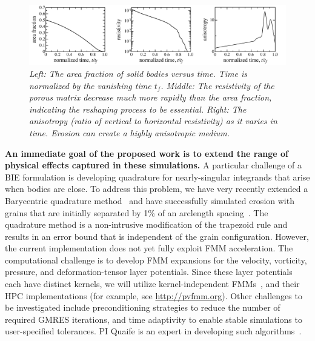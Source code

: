 \documentclass[11pt]{article}
\begin{document}
\begin{figure}%
\begin{center}
\includegraphics[width = 0.99 \textwidth]{./figs/fig3.pdf}
  \caption{\label{fig3} \em Left: The area fraction of solid bodies versus time. Time is normalized by the vanishing time $t_f$.  Middle: The resistivity of the porous matrix decrease much more rapidly than the area fraction, indicating the reshaping process to be essential. Right: The anisotropy (ratio of vertical to horizontal resistivity) as it varies in time. Erosion can create a highly anisotropic medium.} 
\end{center}
\end{figure}

{\bf An immediate goal of the proposed work is to extend the range of
physical effects captured in these simulations.} A particular challenge
of a BIE formulation is developing quadrature for nearly-singular
integrands that arise when bodies are close. To address this problem, we
have very recently extended a Barycentric quadrature
method~\cite{bar2014, bar-wu-vee2015} and have successfully simulated
erosion with grains that are initially separated by 1\% of an arclength
spacing~\cite{chi-moo-qua2019}. The quadrature method is a non-intrusive
modification of the trapezoid rule and results in an error bound that is
independent of the grain configuration. However, the current
implementation does not yet fully exploit FMM acceleration. The
computational challenge is to develop FMM expansions for the velocity,
vorticity, pressure, and deformation-tensor layer potentials. Since these layer potentials each have distinct kernels, we will utilize kernel-independent FMMs~\cite{yin-bir-zor2004, fon-dar2009}, and their HPC implementations (for example, see \url{http://pvfmm.org}). Other challenges to be investigated include preconditioning strategies to reduce the number of required GMRES iterations, and time adaptivity to enable stable simulations to user-specified tolerances. PI Quaife is an expert in developing such algorithms~\cite{qua-bir2015b, qua-bir2016, qua-bir2015a, qua-cou-dar2018}.
\end{document}
